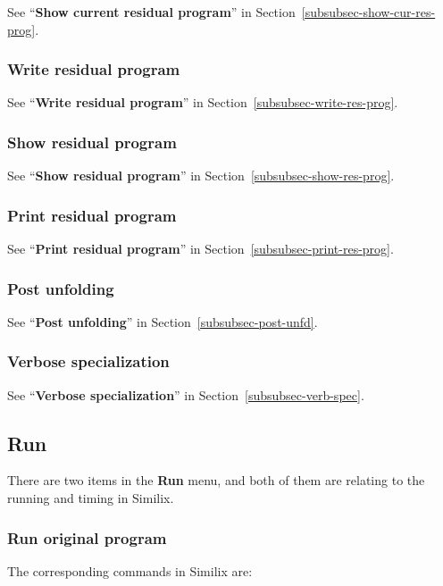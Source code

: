\begin{sloppypar}
See ``{\bf Show current residual program}'' in
Section~\ref{subsubsec-show-cur-res-prog}.

\subsubsection{Write residual program}

See ``{\bf Write residual program}'' in
Section~\ref{subsubsec-write-res-prog}.

\subsubsection{Show residual program}

See ``{\bf Show residual program}'' in
Section~\ref{subsubsec-show-res-prog}.

\subsubsection{Print residual program}

See ``{\bf Print residual program}'' in
Section~\ref{subsubsec-print-res-prog}.

\subsubsection{Post unfolding}

See ``{\bf Post unfolding}'' in
Section~\ref{subsubsec-post-unfd}.

\subsubsection{Verbose specialization}

See ``{\bf Verbose specialization}'' in
Section~\ref{subsubsec-verb-spec}.


\subsection{Run}


There are two items in the {\bf Run} menu, and both of them are
relating to the running and timing in Similix.


\subsubsection{Run original program}


The corresponding commands in Similix are:


\end{sloppypar}
